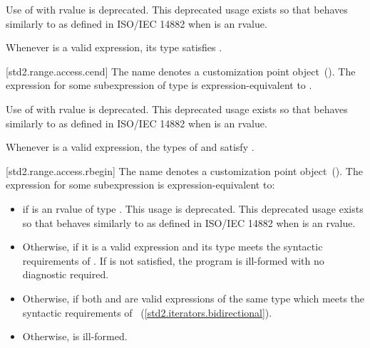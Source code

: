 \pnum
Use of  with rvalue  is deprecated.
\enternote This deprecated usage exists so that 
behaves similarly to  as defined in ISO/IEC 14882 when
 is an rvalue. \exitnote

\pnum
\enternote Whenever  is a valid expression, its
type satisfies . \exitnote

[std2.range.access.cend]{}
\pnum
The name  denotes a customization point
object~(). The expression
 for some subexpression  of type 
is expression-equivalent to .

\pnum
Use of  with rvalue  is deprecated.
\enternote This deprecated usage exists so that 
behaves similarly to  as defined in ISO/IEC 14882 when
 is an rvalue. \exitnote

\pnum
\enternote Whenever  is a valid expression, the
types of  and  satisfy
. \exitnote

[std2.range.access.rbegin]{}
\pnum
The name  denotes a customization point
object~(). The expression
 for some subexpression  is expression-equivalent
to:

\begin{itemize}
\item
   if  is an rvalue of
  type . This usage is deprecated.
  \enternote This deprecated usage exists so that
   behaves similarly to 
  as defined in ISO/IEC 14882 when  is an rvalue. \exitnote

\item
  Otherwise,  if it is a valid expression and its type  meets the
  syntactic requirements of . If 
  is not satisfied, the program is ill-formed with no diagnostic
  required.

\item
  Otherwise,  if both
   and  are valid expressions of the same
  type  which meets the syntactic requirements of
  ~(\ref{std2.iterators.bidirectional}).

\item
  Otherwise,  is ill-formed.
\end{itemize}

